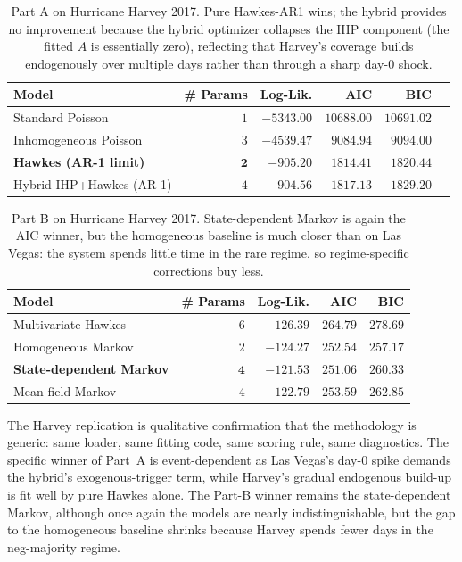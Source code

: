\documentclass[11pt]{article}
\begin{document}
\begin{table}[H]
\centering
\caption{Part A on Hurricane Harvey 2017. Pure Hawkes-AR1 wins; the hybrid
provides no improvement because the hybrid optimizer collapses the IHP
component (the fitted $A$ is essentially zero), reflecting that Harvey's
coverage builds endogenously over multiple days rather than through a
sharp day-0 shock.}
\label{tab:harvey-partA}
\begin{tabular}{lrrrrr}
\toprule
Model & \# Params & Log-Lik. & AIC & BIC \\
\midrule
Standard Poisson         & $1$ & $-5343.00$ & $10688.00$ & $10691.02$ \\
Inhomogeneous Poisson    & $3$ & $-4539.47$ & $9084.94$  & $9094.00$  \\
\textbf{Hawkes (AR-1 limit)} & $\mathbf{2}$ & $\mathbf{-905.20}$  & $\mathbf{1814.41}$  & $\mathbf{1820.44}$ \\
Hybrid IHP+Hawkes (AR-1) & $4$ & $-904.56$  & $1817.13$  & $1829.20$  \\
\bottomrule
\end{tabular}
\end{table}

\begin{table}[H]
\centering
\caption{Part B on Hurricane Harvey 2017. State-dependent Markov is again the
AIC winner, but the homogeneous baseline is much closer than on Las Vegas:
the system spends little time in the rare regime, so regime-specific
corrections buy less.}
\label{tab:harvey-partB}
\begin{tabular}{lrrrr}
\toprule
Model & \# Params & Log-Lik. & AIC & BIC \\
\midrule
Multivariate Hawkes        & $6$ & $-126.39$ & $264.79$ & $278.69$ \\
Homogeneous Markov         & $2$ & $-124.27$ & $252.54$ & $257.17$ \\
\textbf{State-dependent Markov} & $\mathbf{4}$ & $\mathbf{-121.53}$ & $\mathbf{251.06}$ & $\mathbf{260.33}$ \\
Mean-field Markov          & $4$ & $-122.79$ & $253.59$ & $262.85$ \\
\bottomrule
\end{tabular}
\end{table}

The Harvey replication is qualitative confirmation that the methodology is
generic: same loader, same fitting code, same scoring rule, same diagnostics.
The specific winner of Part~A is event-dependent as Las Vegas's day-0 spike
demands the hybrid's exogenous-trigger term, while Harvey's gradual
endogenous build-up is fit well by pure Hawkes alone. The Part-B winner
remains the state-dependent Markov, although once again the models are nearly 
indistinguishable, but the gap to the homogeneous baseline
shrinks because Harvey spends fewer days in the neg-majority regime.
\end{document}
